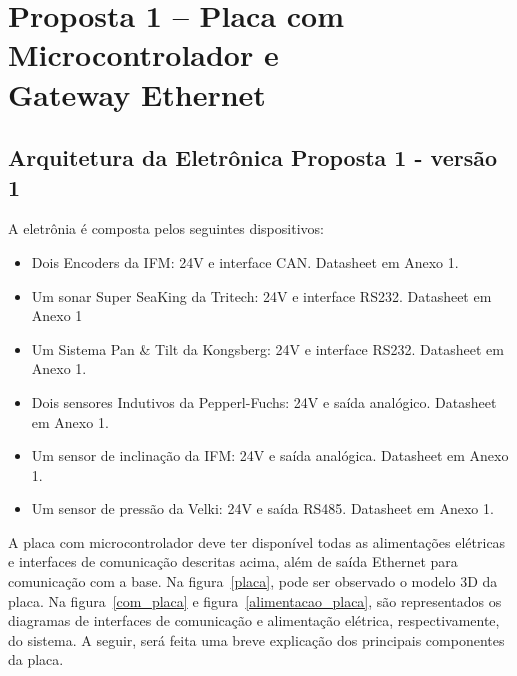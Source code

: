 


\section[Proposta 1 – Placa com Microcontrolador e Gateway Ethernet]{Proposta 1
– Placa com Microcontrolador e \\Gateway Ethernet}

\subsection{Arquitetura da Eletrônica Proposta 1 - versão 1}
A eletrônia é composta pelos seguintes dispositivos:
\begin{itemize}
  \item Dois Encoders da IFM: 24V e interface CAN. Datasheet em Anexo 1.
  \item Um sonar Super SeaKing da Tritech: 24V e interface RS232. Data\-sheet em
  Anexo 1
  \item Um Sistema Pan \& Tilt da Kongsberg: 24V e interface RS232. Data\-sheet
  em Anexo 1.
  \item Dois sensores Indutivos da Pepperl-Fuchs: 24V e saída ana\-lógico.
  Data\-sheet em Anexo 1.
  \item Um sensor de inclinação da IFM: 24V e saída analógica.
  Data\-sheet em Anexo 1.
  \item Um sensor de pressão da Velki: 24V e saída RS485. Datasheet em Anexo 1.
\end{itemize}

A placa com microcontrolador deve ter disponível todas as alimentações elétricas
e interfaces de comunicação descritas acima, além de saída Ethernet para
comunicação com a base. Na figura~\ref{placa}, pode ser observado o modelo 3D da
placa. Na figura~\ref{com_placa} e figura~\ref{alimentacao_placa}, são
representados os diagramas de interfaces de comunicação e alimentação elétrica,
respectivamente, do sistema. A seguir, será feita uma breve explicação dos
principais componentes da placa.

